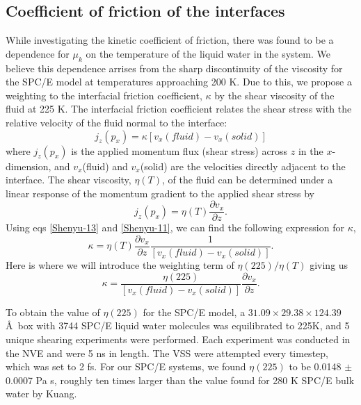 \documentclass{pnastwo}
\begin{document}
\begin{article}
\subsection{Coefficient of friction of the interfaces}
While investigating the kinetic coefficient of friction, there was found 
to be a dependence for $\mu_k$ 
on the temperature of the liquid water in the system. We believe this 
dependence
arrises from the sharp discontinuity of the viscosity for the SPC/E model
at temperatures approaching 200 K\cite{Kuang12}. Due to this, we propose
a weighting to the interfacial friction coefficient, $\kappa$ by the 
shear viscosity of the fluid at 225 K. The interfacial friction coefficient 
relates the shear stress with the relative velocity of the fluid normal to the 
interface:
\begin{equation}\label{Shenyu-13}
j_{z}(p_{x}) = \kappa[v_{x}(fluid)-v_{x}(solid)]
\end{equation}
where $j_{z}(p_{x})$ is the applied momentum flux (shear stress) across $z$ 
in the 
$x$-dimension, and $v_{x}$(fluid) and $v_{x}$(solid) are the velocities
directly adjacent to the interface. The shear viscosity, $\eta(T)$, of the 
fluid can be determined under a linear response of the momentum 
gradient to the applied shear stress by
\begin{equation}\label{Shenyu-11}
j_{z}(p_{x}) = \eta(T) \frac{\partial v_{x}}{\partial z}.
\end{equation}
Using eqs \eqref{Shenyu-13} and \eqref{Shenyu-11}, we can find the following
expression for $\kappa$,
\begin{equation}\label{kappa-1}
\kappa = \eta(T) \frac{\partial v_{x}}{\partial z}\frac{1}{[v_{x}(fluid)-v_{x}(solid)]}.
\end{equation}
Here is where we will introduce the weighting term of $\eta(225)/\eta(T)$ 
giving us
\begin{equation}\label{kappa-2}
\kappa = \frac{\eta(225)}{[v_{x}(fluid)-v_{x}(solid)]}\frac{\partial v_{x}}{\partial z}.
\end{equation}

To obtain the value of $\eta(225)$ for the SPC/E model, a $31.09 \times 29.38
\times 124.39$ \AA\ box with 3744 SPC/E liquid water molecules was 
equilibrated to 225K, 
and 5 unique shearing experiments were performed. Each experiment was
conducted in the NVE and were 5 ns in 
length. The VSS were attempted every timestep, which was set to 2 fs. 
For our SPC/E systems, we found $\eta(225)$  to be 0.0148 $\pm$ 0.0007 Pa s,
roughly ten times larger than the value found for 280 K SPC/E bulk water by
Kuang\cite{Kuang12}. 


\end{article}
\end{document}
